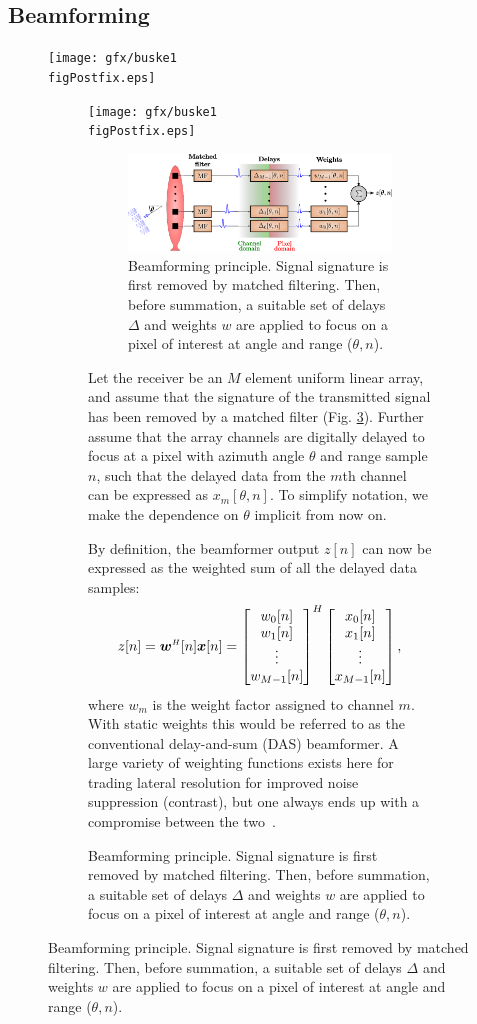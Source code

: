 \subsection{Beamforming}
\ifPhdDoc
\begin{figure}[htbp]\centering
\texttt{[image: gfx/buske1\\figPostfix.eps]}
\else
\ifPeerReview
\begin{figure}[htbp]\centering
\texttt{[image: gfx/buske1\\figPostfix.eps]}
\else
\begin{figure}[!t]\centering
\includegraphics[width=\linewidth]{gfx/beamforming.eps}
\fi\fi%
\caption{Beamforming principle. Signal signature is first removed by matched filtering. Then, before summation, a suitable set of delays $\Delta$ and weights $w$ are applied to focus on a pixel of interest at angle and range ($\theta,n$).}\label{I_beamforming}
\end{figure}
Let the receiver be an $M$ element uniform linear array, and assume that the signature of the transmitted signal has been removed by a matched filter (Fig. \ref{I_beamforming}). Further assume that the array channels are digitally delayed to focus at a pixel with azimuth angle $\theta$ and range sample $n$, such that the delayed data from the $m$th channel can be expressed as $x_m[\theta,n]$. To simplify notation, we make the dependence on $\theta$ implicit from now on. 

By definition, the beamformer output $z[n]$ can now be expressed as the weighted sum of all the delayed data samples:
\begin{align}
z[n] = \w\H[n]\x[n] = \bmat{w_0[n]\\w_1[n]\\\vdots\\w_{M-1}[n]}^H \bmat{x_0[n]\\x_1[n]\\\vdots\\x_{M-1}[n]},\label{I_z}
\end{align}
where $w_m$ is the weight factor assigned to channel $m$. With static weights this would be referred to as the conventional delay-and-sum (DAS) beamformer. A large variety of weighting functions exists here for trading lateral resolution for improved noise suppression (contrast), but one always ends up with a compromise between the two~\cite{Harris1978}.


\end{figure}
\end{figure}
